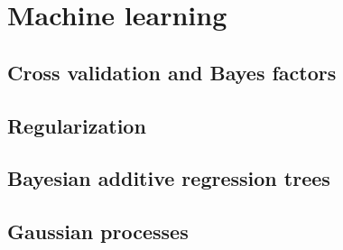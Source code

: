 \chapter{Machine learning}\label{chap13}

\section{Cross validation and Bayes factors}\label{sec13_1}

\section{Regularization}\label{sec13_2}

\section{Bayesian additive regression trees}\label{sec13_3}

\section{Gaussian processes}\label{13_4}